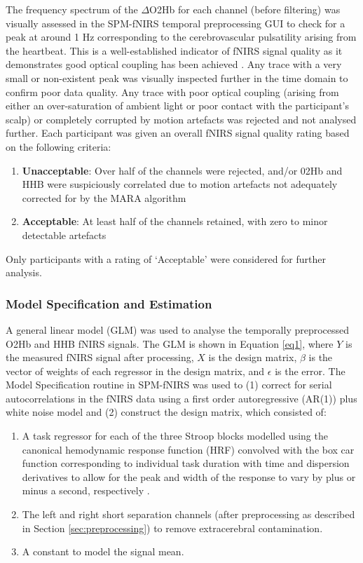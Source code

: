 \documentclass[12pt]{spieman}  %
\begin{document}
\begin{spacing}{2}
The frequency spectrum of the $\Delta$O2Hb for each channel (before filtering) was visually assessed in the SPM-fNIRS temporal preprocessing GUI to check for a peak at around 1 Hz corresponding to the cerebrovascular pulsatility arising from the heartbeat. This is a well-established indicator of fNIRS signal quality as it demonstrates good optical coupling has been achieved \cite{Yucel2021}. Any trace with a very small or non-existent peak was visually inspected further in the time domain to confirm poor data quality. Any trace with poor optical coupling (arising from either an over-saturation of ambient light or poor contact with the participant's scalp) or completely corrupted by motion artefacts was rejected and not analysed further. Each participant was given an overall fNIRS signal quality rating based on the following criteria:
\begin{enumerate}   
\item{\textbf{Unacceptable}: Over half of the channels were rejected, and/or 02Hb and HHB were suspiciously correlated due to motion artefacts not adequately corrected for by the MARA algorithm}
\item{\textbf{Acceptable}: At least half of the channels retained, with zero to minor detectable artefacts}
\end{enumerate}

 Only participants with a rating of `Acceptable' were considered for further analysis.


\subsubsection{Model Specification and Estimation}
A general linear model (GLM) was used to analyse the temporally preprocessed O2Hb and HHB fNIRS signals. The GLM is shown in Equation \ref{eq1}\cite{Pinti2017, Scholkmann2014, Huppert2016a}, where $Y$ is the measured fNIRS signal after processing, $X$ is the design matrix, $\beta$ is the vector of weights of each regressor in the design matrix, and $\epsilon$ is the error. The Model Specification routine in SPM-fNIRS was used to (1) correct for serial autocorrelations in the fNIRS data using a first order autoregressive (AR(1)) plus white noise model \cite{Friston2002, Purdon1998} and (2) construct the design matrix, which consisted of:

\begin{enumerate}
\item{A task regressor for each of the three Stroop blocks modelled using the canonical hemodynamic response function (HRF) convolved with the box car function corresponding to individual task duration with time and dispersion derivatives to allow for the peak and width of the response to vary by plus or minus a second, respectively \cite{ MartinA.Lindquist2009}.}
\item{The left and right short separation channels (after preprocessing as described in Section \ref{sec:preprocessing}) to remove extracerebral contamination\cite{Yucel2015, Scholkmann2014}.}
\item{A constant to model the signal mean.}
\end{enumerate}


\end{spacing}
\end{document}
